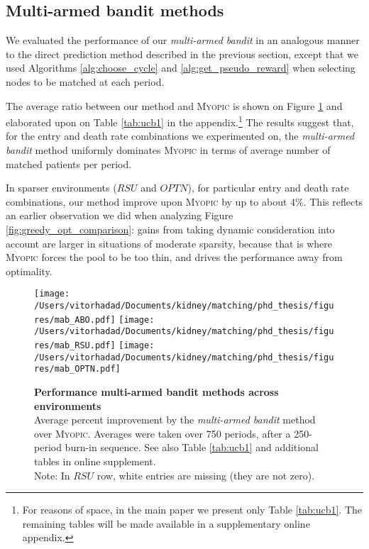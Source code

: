 \documentclass[format=acmsmall, review=false]{acmart}
\begin{document}
\subsection{Multi-armed bandit methods}

We evaluated the performance of our \emph{multi-armed bandit} in an analogous manner to the direct prediction method described in the previous section, except that we used Algorithms \ref{alg:choose_cycle} and \ref{alg:get_pseudo_reward} when selecting nodes to be matched at each period.

The average ratio between our method and \textsc{Myopic} is shown on Figure \ref{fig:mab} and elaborated upon on Table \ref{tab:ucb1} in the appendix.\footnote{For reasons of space, in the main paper we present only Table \ref{tab:ucb1}. The remaining tables will be made available in a supplementary online appendix.} The results suggest that, for the entry and death rate combinations we experimented on, the \emph{multi-armed bandit} method uniformly dominates \textsc{Myopic} in terms of average number of matched patients per period.

In sparser environments ($RSU$ and $OPTN$), for particular entry and death rate combinations, our method improve upon \textsc{Myopic} by up to about 4\%. This reflects an earlier observation we did when analyzing Figure \ref{fig:greedy_opt_comparison}: gains from taking dynamic consideration into account are larger in situations of moderate sparsity, because that is where \textsc{Myopic} forces the pool to be too thin, and drives the performance away from optimality.





\begin{figure}
\centering
\hspace*{-1.6cm}
\texttt{[image: /Users/vitorhadad/Documents/kidney/matching/phd\_thesis/figures/mab\_ABO.pdf]}
\hspace*{-1.6cm}
\texttt{[image: /Users/vitorhadad/Documents/kidney/matching/phd\_thesis/figures/mab\_RSU.pdf]}
\hspace*{-1.6cm}
\texttt{[image: /Users/vitorhadad/Documents/kidney/matching/phd\_thesis/figures/mab\_OPTN.pdf]}
\caption{\textbf{Performance multi-armed bandit methods across environments} \\
Average percent improvement by the \emph{multi-armed bandit} method over \textsc{Myopic}. Averages were taken over 750 periods, after a 250-period burn-in sequence. See also Table \ref{tab:ucb1} and additional tables in online supplement. \\
{\scriptsize Note: In $RSU$ row, white entries are missing (they are not zero).}}
\label{fig:mab}
\end{figure}
\end{document}
